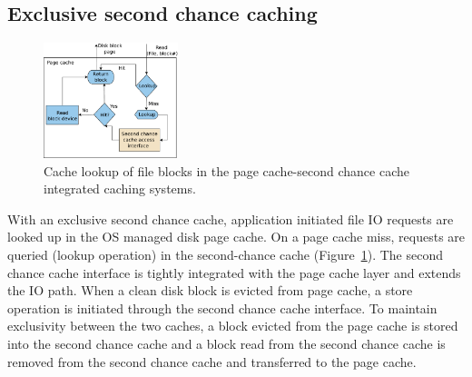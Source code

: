 \subsection{Exclusive second chance caching}
\label{subsec:hcache}

\begin{figure}[t]
\centering
\includegraphics[width=0.35\textwidth]{images/cc_get}
 \caption{Cache lookup of file blocks in the page cache-second chance
cache integrated caching systems.}
 \label{fig:cc_get}
\vspace{-0.4cm}
\end{figure}


%

With an exclusive second chance cache, application initiated file IO
requests are looked up in the OS managed disk page cache.
%
On a page cache miss, requests
are queried (lookup operation) in the second-chance cache (Figure~\ref{fig:cc_get}).
%
The second chance cache interface is tightly integrated with the page cache layer
and extends the IO path.
%
When a clean disk block is evicted from page cache, a store operation is
initiated through the second chance cache interface.
%
To maintain exclusivity between the two caches, a block evicted from the
page cache is stored into the second chance cache and a block read from 
the second chance cache is removed from the second chance cache
and transferred to the page cache.

